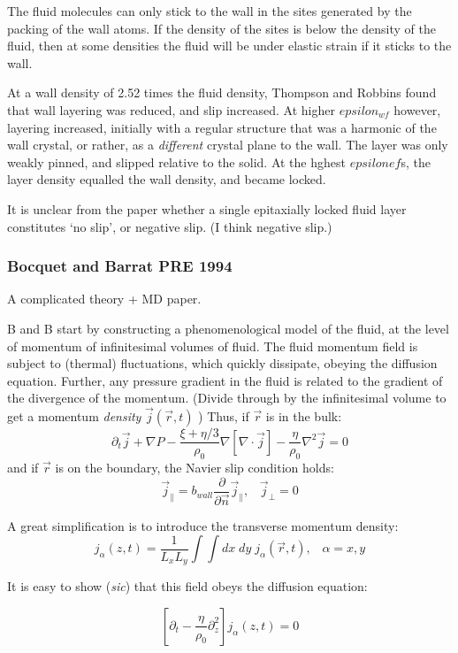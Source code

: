 \documentclass[twocolumn]{article}
\begin{document}
The fluid molecules can only stick to the wall in the sites generated by the packing of the wall atoms. If the density of the sites is below the density of the fluid, then at some densities the fluid will be under elastic strain if it sticks to the wall.

At a wall density of 2.52 times the fluid density, Thompson and Robbins found that wall layering was reduced, and slip increased.  At higher $epsilon_{wf}$ however, layering increased, initially with a regular structure that was a harmonic of the wall crystal, or rather, as a \emph{different} crystal plane to the wall. The layer was only weakly pinned, and slipped relative to the solid.  At the hghest $epsilon{ef}$s, the layer density equalled the wall density, and became locked.

It is unclear from the paper whether a single epitaxially locked fluid layer constitutes `no slip', or negative slip. (I think negative slip.)


\subsubsection*{Bocquet and Barrat PRE 1994}
A complicated theory + MD paper.

B and B start by constructing a phenomenological model of the fluid, at the level of momentum of infinitesimal volumes of fluid.  The fluid momentum field is subject to (thermal) fluctuations, which quickly dissipate, obeying the diffusion equation. Further, any pressure gradient in the fluid is related to the gradient of the divergence of the momentum. (Divide through by the infinitesimal volume to get a momentum \emph{density} $\vec{j}(\vec{r},t) $ ) Thus, if $\vec{r}$ is in the bulk:
\[ \partial_{t} \vec{j} +\nabla P - \frac{\xi + \eta /3}{\rho_{0}} \nabla [ \nabla \cdot \vec{j}]
  - \frac{\eta}{\rho_{0}} \nabla^{2} \vec{j} = 0 \]
and if $\vec{r}$ is on the boundary, the Navier slip condition holds:
\[ \vec{j}_{\parallel} = b_{wall} \frac{\partial}{\partial \vec{n}} \vec{j}_{\parallel}, \;\;\; \vec{j}_{\perp} = 0 \]

A great simplification is to introduce the transverse momentum density:
\[ j_{\alpha}(z,t) = \frac{1}{L_{x}L_{y}} \int \int dx\;dy\; j_{\alpha}(\vec{r},t),   \;\;\;  \alpha = x,y \]

It is easy to show (\emph{sic}) that this field obeys the diffusion equation:

\[ \left[  \partial_{t} - \frac{\eta}{\rho_{0}} \partial^{2}_{z} \right] 
  j_{\alpha}(z,t) = 0 \]
\end{document}
